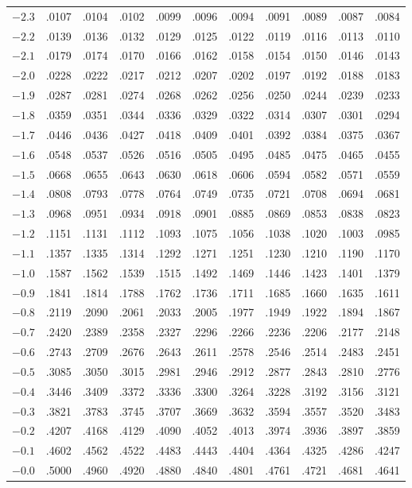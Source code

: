 \documentclass[11pt]{article}
\begin{document}
\begin{center}
{\begin{tabular}{|c|cccccccccc|}
$-2.3$ & .0107 & .0104 & .0102 & .0099 & .0096 & .0094 & .0091 & .0089 & .0087 & .0084 \\
$-2.2$ & .0139 & .0136 & .0132 & .0129 & .0125 & .0122 & .0119 & .0116 & .0113 & .0110 \\
$-2.1$ & .0179 & .0174 & .0170 & .0166 & .0162 & .0158 & .0154 & .0150 & .0146 & .0143 \\
$-2.0$ & .0228 & .0222 & .0217 & .0212 & .0207 & .0202 & .0197 & .0192 & .0188 & .0183 \\
\hline
$-1.9$ & .0287 & .0281 & .0274 & .0268 & .0262 & .0256 & .0250 & .0244 & .0239 & .0233 \\
$-1.8$ & .0359 & .0351 & .0344 & .0336 & .0329 & .0322 & .0314 & .0307 & .0301 & .0294 \\
$-1.7$ & .0446 & .0436 & .0427 & .0418 & .0409 & .0401 & .0392 & .0384 & .0375 & .0367 \\
$-1.6$ & .0548 & .0537 & .0526 & .0516 & .0505 & .0495 & .0485 & .0475 & .0465 & .0455 \\
$-1.5$ & .0668 & .0655 & .0643 & .0630 & .0618 & .0606 & .0594 & .0582 & .0571 & .0559 \\
\hline
$-1.4$ & .0808 & .0793 & .0778 & .0764 & .0749 & .0735 & .0721 & .0708 & .0694 & .0681 \\
$-1.3$ & .0968 & .0951 & .0934 & .0918 & .0901 & .0885 & .0869 & .0853 & .0838 & .0823 \\
$-1.2$ & .1151 & .1131 & .1112 & .1093 & .1075 & .1056 & .1038 & .1020 & .1003 & .0985 \\
$-1.1$ & .1357 & .1335 & .1314 & .1292 & .1271 & .1251 & .1230 & .1210 & .1190 & .1170 \\
$-1.0$ & .1587 & .1562 & .1539 & .1515 & .1492 & .1469 & .1446 & .1423 & .1401 & .1379 \\
\hline
$-0.9$ & .1841 & .1814 & .1788 & .1762 & .1736 & .1711 & .1685 & .1660 & .1635 & .1611 \\
$-0.8$ & .2119 & .2090 & .2061 & .2033 & .2005 & .1977 & .1949 & .1922 & .1894 & .1867 \\
$-0.7$ & .2420 & .2389 & .2358 & .2327 & .2296 & .2266 & .2236 & .2206 & .2177 & .2148 \\
$-0.6$ & .2743 & .2709 & .2676 & .2643 & .2611 & .2578 & .2546 & .2514 & .2483 & .2451 \\
$-0.5$ & .3085 & .3050 & .3015 & .2981 & .2946 & .2912 & .2877 & .2843 & .2810 & .2776 \\
\hline
$-0.4$ & .3446 & .3409 & .3372 & .3336 & .3300 & .3264 & .3228 & .3192 & .3156 & .3121 \\
$-0.3$ & .3821 & .3783 & .3745 & .3707 & .3669 & .3632 & .3594 & .3557 & .3520 & .3483 \\
$-0.2$ & .4207 & .4168 & .4129 & .4090 & .4052 & .4013 & .3974 & .3936 & .3897 & .3859 \\
$-0.1$ & .4602 & .4562 & .4522 & .4483 & .4443 & .4404 & .4364 & .4325 & .4286 & .4247 \\
$-0.0$ & .5000 & .4960 & .4920 & .4880 & .4840 & .4801 & .4761 & .4721 & .4681 & .4641 \\
\hline
\end{tabular}}
\end{center}
\end{document}
